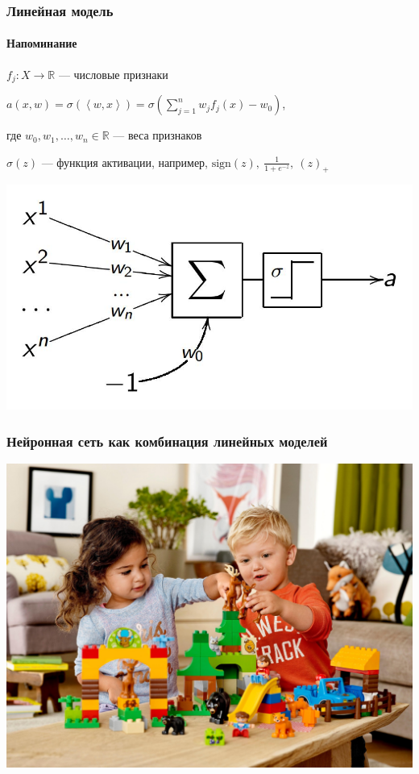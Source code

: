 \documentclass[fullscreen=true, bookmarks=true, hyperref={pdfencoding=unicode}]{beamer}
\begin{document}
\begin{frame}
  \frametitle{Линейная модель}
  \framesubtitle{Напоминание}
  $f_j: X \to \mathbb{R}$ — числовые признаки

  $a(x, w) = \sigma(\left<w, x\right>) = \sigma \left(\sum\limits_{j=1}^n w_j f_j(x) - w_0 \right)$,

  где $w_0, w_1, \dots, w_n \in \mathbb{R}$ — веса признаков

  $\sigma(z)$ — функция активации, например, $\text{sign}(z),\ \frac{1}{1+e^{-z}},\ (z)_+$
  \begin{center}
    \includegraphics[keepaspectratio,
                     height=0.4\paperheight]{lin_as_nn.jpg}
  \end{center}
\end{frame}


\begin{frame}
  \frametitle{Нейронная сеть как комбинация линейных моделей}
  \begin{center}
    \includegraphics[keepaspectratio,
                     height=0.8\paperheight]{nn-as-lego-duplo.jpg}
  \end{center}
\end{frame}
\end{document}
